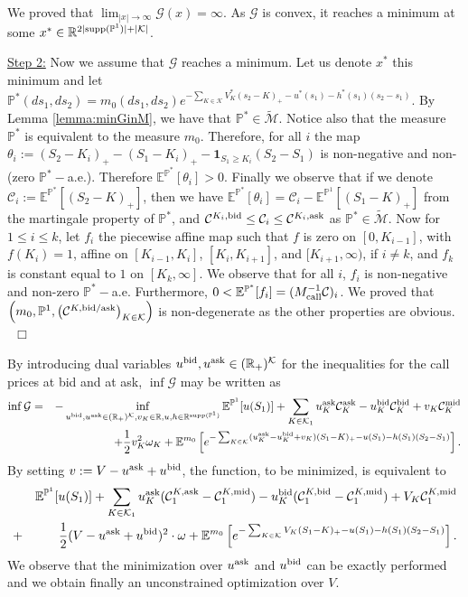 \documentclass{amsart}%
\def \E{\mathbb{E}}
\def \P{{\mathbb P}}
\def \R{\mathbb{R}}
\def\Cc{{\cal C}}
\def\Gc{{\cal G}}
\def\Kc{{\cal K}}
\def\no{\noindent}
\def \ep{\hbox{ }\hfill{ ${\cal t}$~\hspace{-5.1mm}~${\cal u}$   } }
\def \ep{\hbox{ }\hfill$\Box$}
\theoremstyle{definition}
\theoremstyle{remark}
\newcommand{\PP}{\mathbb{P}}
\newcommand{\beaa}{\begin{eqnarray*}}
\newcommand{\eeaa}{\end{eqnarray*}}
\newcommand{\EE}{{\mathbb E}}
\newcommand{\RR}{{\mathbb R}}
\newcommand{\cal}{\mathcal}
\begin{document}
\no We proved that $\lim_{|x|\to\infty}\Gc(x) = \infty$. As $\Gc$ is convex, it reaches a minimum at some $x^*\in \R^{2|{\rm supp}(\P^1)|+|\Kc|}$.

\no\underline{\rm Step 2:} Now we assume that $\Gc$ reaches a minimum. Let us denote $x^*$ this minimum and let $\PP^*(ds_1,ds_2)={m_0}(ds_1,ds_2) e^{- \sum_{K \in {\cal K}} V_K^* (s_{2}-K)_+-u^*(s_1) -h^*(s_1)(s_2-s_1)  } $. By Lemma \ref{lemma:minGinM}, we have that $\P^*\in \widetilde{\cal M}$. Notice also that the measure $\P^*$ is equivalent to the measure $m_0$. Therefore, for all $i$ the map $\theta_i:= (S_2-K_i)_+- (S_1-K_i)_+-\mathbf{1}_{S_1\ge K_i}(S_2-S_1)$ is non-negative and non-(zero $\P^*-$a.e.). Therefore $\E^{\P^*}[\theta_i]>0$. Finally we observe that if we denote $\Cc_i:= \E^{\P^*}[(S_2-K)_+]$, then we have $\E^{\P^*}[\theta_i]=\Cc_i - \E^{\P^1}[(S_1-K)_+]$ from the martingale property of $\P^*$, and $\Cc^{K_i,{\rm bid}}\le \Cc_i\le \Cc^{K_i,{\rm ask}}$ as $\P^*\in \widetilde{\cal M}$.
Now for $1\le i\le k$, let $f_i$ the piecewise affine map such that $f$ is zero on $[0,K_{i-1}]$, with $f(K_i) =1$, affine on $[K_{i-1},K_i]$, $[K_{i},K_{i+1}]$, and $[K_{i+1},\infty)$, if $i\neq k$, and $f_k$ is constant equal to $1$ on $[K_k,\infty]$. We observe that for all $i$, $f_i$ is non-negative and non-zero $\P^*-$a.e. Furthermore, $0<\E^{\P^*}[f_i]=(M_{\rm call}^{-1}\Cc)_i$. We proved that $\left(m_0, \P^1, \left(\Cc^{K,{\rm bid/ask}}\right)_{K\in\Kc}\right)$ is non-degenerate as the other properties are obvious.
\ep





\no{\bf Proof of Theorem \ref{thm:minimG_elem_M}}
By introducing dual variables $u^{\rm bid},u^{\rm ask} \in (\RR_+)^{\Kc}$ for the inequalities for the call prices at bid and at ask, $\inf \Gc$ may be written as
\beaa
\inf \Gc&=&-\inf_{u^{\rm bid},u^{\rm ask} \in (\RR_+)^{\Kc}, v_K \in \RR,u,h \in \RR^{{\rm supp}(\P^1)}} \E^{\P^1}[u(S_1)]+\sum_{K \in {\cal K}_1} u_K^{\rm ask}\Cc^\mathrm{ask}_{K}-u_K^{\rm bid}\Cc^\mathrm{bid}_{K} +v_K\Cc^\mathrm{mid}_{K} \\
&&+ \frac{1 }{2}v_K^2 \omega_K+
\EE^{{m_0}}\left[  e^{-\sum_ {K \in {\cal K} } (u_K^{\rm ask}-u_K^{\rm bid} + v_K) (S_{1}-K)_+-u(S_1) -h(S_1) (S_{2}-S_1)}\right].
\eeaa
\no By setting  $v:=V-u^{\rm ask}+u^{\rm bid}$, the function, to be minimized, is equivalent to
\beaa
&&\E^{\P^1}[u(S_1)]+\sum_{K\in\Kc_1}u^{\rm ask}_K(\Cc_1^{K,\mathrm{ask}}-\Cc_1^{K,\mathrm{mid}})-u^{\rm bid}_K(\Cc_1^{K,\mathrm{bid}}-\Cc_1^{K,\mathrm{mid}})+V_K\Cc_1^{K,\mathrm{mid}}\\
&+&\frac{1 }{2}(V-u^{\rm ask}+u^{\rm bid})^2 \cdot\omega+
\EE^{{m_0}}\left[  e^{- \sum_{K \in {\cal K}}V_K (S_1-K)_+-u(S_1) -h(S_1) (S_{2}-S_1) }\right].
\eeaa
\no We observe that the minimization over $u^{\rm ask}$ and $u^{\rm bid}$ can be exactly performed and we obtain finally  an unconstrained optimization over $V$.
\end{document}
